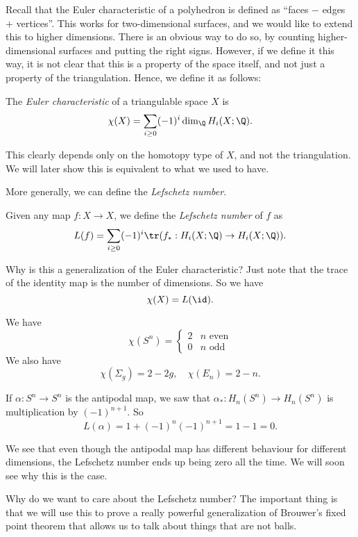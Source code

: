 \documentclass[a4paper]{article}
\begin{document}
Recall that the Euler characteristic of a polyhedron is defined as ``faces $-$ edges $+$ vertices''. This works for two-dimensional surfaces, and we would like to extend this to higher dimensions. There is an obvious way to do so, by counting higher-dimensional surfaces and putting the right signs. However, if we define it this way, it is not clear that this is a property of the space itself, and not just a property of the triangulation. Hence, we define it as follows:

\begin{defi}
  The \emph{Euler characteristic} of a triangulable space $X$ is
  \[
    \chi(X) = \sum_{i \geq 0} (-1)^i \dim_\Q H_i(X; \Q).
  \]
\end{defi}
This clearly depends only on the homotopy type of $X$, and not the triangulation. We will later show this is equivalent to what we used to have.

More generally, we can define the \emph{Lefschetz number}.
\begin{defi}
  Given any map $f: X \to X$, we define the \emph{Lefschetz number} of $f$ as
  \[
    L(f) = \sum_{i \geq 0} (-1)^i \tr(f_*: H_i(X; \Q) \to H_i(X; \Q)).
  \]
\end{defi}
Why is this a generalization of the Euler characteristic? Just note that the trace of the identity map is the number of dimensions. So we have
\[
  \chi(X) = L (\id).
\]
\begin{eg}
  We have
  \[
    \chi(S^n) =
    \begin{cases}
      2 & n\text{ even}\\
      0 & n\text{ odd}
    \end{cases}
  \]
  We also have
  \[
    \chi(\Sigma_g) = 2 - 2g,\quad \chi(E_n) = 2 - n.
  \]
\end{eg}

\begin{eg}
  If $\alpha: S^n \to S^n$ is the antipodal map, we saw that $\alpha_*: H_n(S^n) \to H_n(S^n)$ is multiplication by $(-1)^{n + 1}$. So
  \[
    L(\alpha) = 1 + (-1)^n (-1)^{n + 1} = 1 - 1 = 0.
  \]
\end{eg}
We see that even though the antipodal map has different behaviour for different dimensions, the Lefschetz number ends up being zero all the time. We will soon see why this is the case.

Why do we want to care about the Lefschetz number? The important thing is that we will use this to prove a really powerful generalization of Brouwer's fixed point theorem that allows us to talk about things that are not balls.
\end{document}
